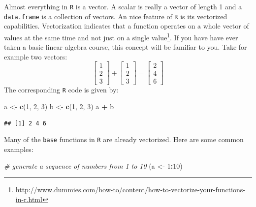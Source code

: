 \documentclass[]{book}
\makeatletter
\newenvironment{Shaded}{\begin{snugshade}}{\end{snugshade}}
\newcommand{\KeywordTok}[1]{\textcolor[rgb]{0.13,0.29,0.53}{\textbf{#1}}}
\newcommand{\DecValTok}[1]{\textcolor[rgb]{0.00,0.00,0.81}{#1}}
\newcommand{\StringTok}[1]{\textcolor[rgb]{0.31,0.60,0.02}{#1}}
\newcommand{\CommentTok}[1]{\textcolor[rgb]{0.56,0.35,0.01}{\textit{#1}}}
\newcommand{\OperatorTok}[1]{\textcolor[rgb]{0.81,0.36,0.00}{\textbf{#1}}}
\newcommand{\NormalTok}[1]{#1}
\let\rmarkdownfootnote\footnote%
\def\footnote{\protect\rmarkdownfootnote}
\newenvironment{kframe}{%
\medskip{}
\setlength{\fboxsep}{.8em}
 \def\at@end@of@kframe{}%
 \ifinner\ifhmode%
  \def\at@end@of@kframe{\end{minipage}}%
  \begin{minipage}{\columnwidth}%
 \fi\fi%
 \def\FrameCommand##1{\hskip\@totalleftmargin \hskip-\fboxsep
 \colorbox{shadecolor}{##1}\hskip-\fboxsep
     \hskip-\linewidth \hskip-\@totalleftmargin \hskip\columnwidth}%
 \MakeFramed {\advance\hsize-\width
   \@totalleftmargin\z@ \linewidth\hsize
   \@setminipage}}%
 {\par\unskip\endMakeFramed%
 \at@end@of@kframe}
\renewenvironment{Shaded}{\begin{kframe}}{\end{kframe}}
\theoremstyle{definition}
\theoremstyle{definition}
\theoremstyle{definition}
\theoremstyle{remark}
\makeatother
\begin{document}
Almost everything in \texttt{R} is a vector. A scalar is really a vector
of length 1 and a \texttt{data.frame} is a collection of vectors. An
nice feature of \texttt{R} is its vectorized capabilities. Vectorization
indicates that a function operates on a whole vector of values at the
same time and not just on a single value\footnote{\url{http://www.dummies.com/how-to/content/how-to-vectorize-your-functions-in-r.html}}.
If you have have ever taken a basic linear algebra course, this concept
will be familiar to you. \newline  \vspace{0.1in} Take for example two
vectors: \newline
\vspace{0.1in} \[
\begin{bmatrix} 1 \\ 2 \\ 3 \end{bmatrix} + 
\begin{bmatrix} 1 \\ 2 \\ 3 \end{bmatrix} =
\begin{bmatrix} 2 \\ 4 \\ 6 \end{bmatrix}
\] \newline  \vspace{0.1in} The corresponding \texttt{R} code is given
by:

\begin{Shaded}
\begin{Highlighting}[]
\NormalTok{a <-}\StringTok{ }\KeywordTok{c}\NormalTok{(}\DecValTok{1}\NormalTok{, }\DecValTok{2}\NormalTok{, }\DecValTok{3}\NormalTok{)}
\NormalTok{b <-}\StringTok{ }\KeywordTok{c}\NormalTok{(}\DecValTok{1}\NormalTok{, }\DecValTok{2}\NormalTok{, }\DecValTok{3}\NormalTok{)}
\NormalTok{a }\OperatorTok{+}\StringTok{ }\NormalTok{b}
\end{Highlighting}
\end{Shaded}

\begin{verbatim}
## [1] 2 4 6
\end{verbatim}

Many of the \texttt{base} functions in \texttt{R} are already
vectorized. Here are some common examples:

\begin{Shaded}
\begin{Highlighting}[]
\CommentTok{# generate a sequence of numbers from 1 to 10}
\NormalTok{(a <-}\StringTok{ }\DecValTok{1}\OperatorTok{:}\DecValTok{10}\NormalTok{)}
\end{Highlighting}
\end{Shaded}
\end{document}
